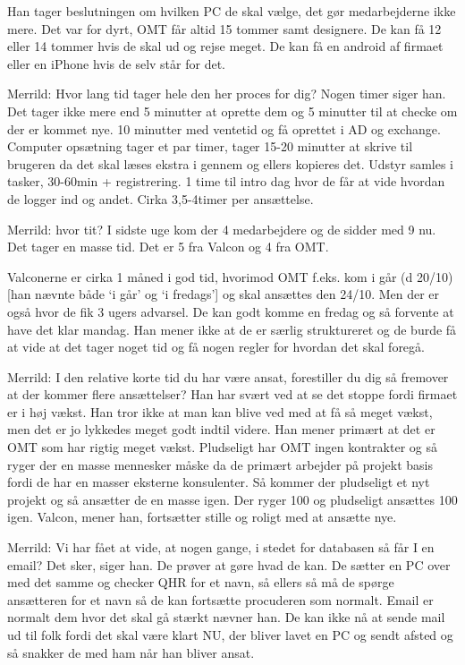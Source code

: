 \begin{linenumbers*}
Han tager beslutningen om hvilken PC de skal vælge, det gør medarbejderne ikke mere. Det var for dyrt, OMT får altid 15 tommer samt designere. De kan få 12 eller 14 tommer hvis de skal ud og rejse meget. 
De kan få en android af firmaet eller en iPhone hvis de selv står for det. 

Merrild: Hvor lang tid tager hele den her proces for dig?
Nogen timer siger han. Det tager ikke mere end 5 minutter at oprette dem og 5 minutter til at checke om der er kommet nye. 10 minutter med ventetid og få oprettet i AD og exchange. Computer opsætning tager et par timer,  tager 15-20 minutter at skrive til brugeren da det skal læses ekstra i gennem og ellers kopieres det.  Udstyr samles i tasker, 30-60min + registrering. 1 time til intro dag hvor de får at vide hvordan de logger ind og andet. Cirka 3,5-4timer per ansættelse. 

Merrild: hvor tit?
I sidste uge kom der 4 medarbejdere og de sidder med 9 nu. Det tager en masse tid. Det er 5 fra Valcon og 4 fra OMT. 

Valconerne er cirka 1 måned i god tid, hvorimod OMT f.eks. kom i går (d 20/10) [han nævnte både ‘i går’ og ‘i fredags’] og skal ansættes den 24/10. Men der er også hvor de fik 3 ugers advarsel. De kan godt komme en fredag og så forvente at have det klar mandag.  Han mener ikke at de er særlig struktureret og de burde få at vide at det tager noget tid og få nogen regler for hvordan det skal foregå.

Merrild: I den relative korte tid du har være ansat, forestiller du dig så fremover at der kommer flere ansættelser?
Han har svært ved at se det stoppe fordi firmaet er i høj vækst. Han tror ikke at man kan blive ved med at få så meget vækst, men det er jo lykkedes meget godt indtil videre. Han mener primært at det er OMT som har rigtig meget vækst. Pludseligt har OMT ingen kontrakter og så ryger der en masse mennesker måske da de primært arbejder på projekt basis fordi de har en masser eksterne konsulenter. Så kommer der pludseligt et nyt projekt og så ansætter de en masse igen. Der ryger 100 og pludseligt ansættes 100 igen. Valcon, mener han, fortsætter stille og roligt med at ansætte nye.

Merrild: Vi har fået at vide, at nogen gange, i stedet for databasen så får I en email?
Det sker, siger han. De prøver at gøre hvad de kan. De sætter en PC over med det samme og checker QHR for et navn, så ellers så må de spørge ansætteren for et navn så de kan fortsætte procuderen som normalt. Email er normalt dem hvor det skal gå stærkt nævner han. De kan ikke nå at sende mail ud til folk fordi det skal være klart NU, der bliver lavet en PC og sendt afsted og så snakker de med ham når han bliver ansat.


\end{linenumbers*}
